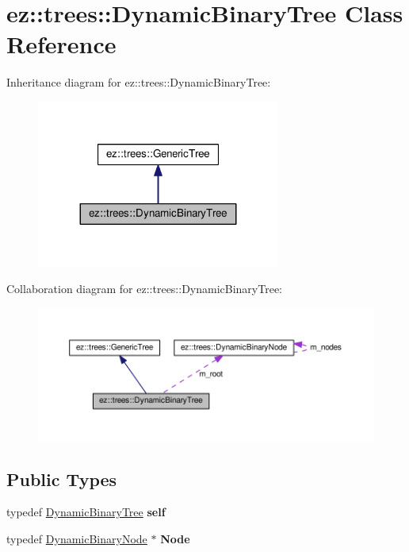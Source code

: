 \hypertarget{classez_1_1trees_1_1DynamicBinaryTree}{}\section{ez\+:\+:trees\+:\+:Dynamic\+Binary\+Tree Class Reference}
\label{classez_1_1trees_1_1DynamicBinaryTree}


Inheritance diagram for ez\+:\+:trees\+:\+:Dynamic\+Binary\+Tree\+:
\nopagebreak
\begin{figure}[H]
\begin{center}
\leavevmode
\includegraphics[width=227pt]{classez_1_1trees_1_1DynamicBinaryTree__inherit__graph}
\end{center}
\end{figure}


Collaboration diagram for ez\+:\+:trees\+:\+:Dynamic\+Binary\+Tree\+:
\nopagebreak
\begin{figure}[H]
\begin{center}
\leavevmode
\includegraphics[width=350pt]{classez_1_1trees_1_1DynamicBinaryTree__coll__graph}
\end{center}
\end{figure}
\subsection*{Public Types}
\begin{DoxyCompactItemize}
\item 
\mbox{\label{classez_1_1trees_1_1DynamicBinaryTree_a7b76d15a64fbaeb7e1f873fe8fb72669}} 
typedef \hyperlink{classez_1_1trees_1_1DynamicBinaryTree}{Dynamic\+Binary\+Tree} {\bfseries self}
\item 
\mbox{\label{classez_1_1trees_1_1DynamicBinaryTree_ac76c0520ea1117a5222f10d8d4161d05}} 
typedef \hyperlink{classez_1_1trees_1_1DynamicBinaryNode}{Dynamic\+Binary\+Node} $\ast$ {\bfseries Node}
\end{DoxyCompactItemize}
